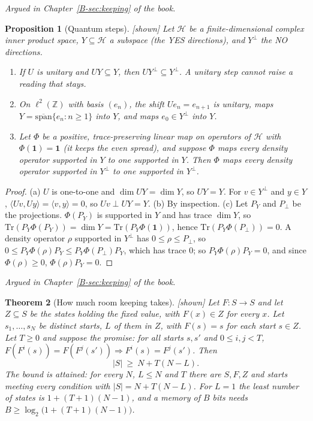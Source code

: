 \documentclass[11pt, a4paper]{article}
\theoremstyle{plain}
\newtheorem{theorem}{Theorem}[section]
\newtheorem{proposition}[theorem]{Proposition}
\theoremstyle{definition}
\theoremstyle{remark}
\newcommand{\Z}{\mathbb{Z}}
\newcommand{\argued}[1]{\par\noindent\textit{Argued in Chapter~\ref{B-#1} of the book.}\par}
\newcommand{\kind}[1]{\textup{[#1]}}
\begin{document}
\argued{sec:keeping}

\begin{proposition}[Quantum steps]\label{spec:quantum} \kind{shown}
Let $\mathcal H$ be a finite-dimensional complex inner product space, $Y\subseteq\mathcal H$ a subspace (the
YES directions), and $Y^\perp$ the NO directions.
\begin{enumerate}[label=(\alph*)]
\item If $U$ is unitary and $UY\subseteq Y$, then $UY^\perp\subseteq Y^\perp$. A unitary step cannot raise a
reading that stays.
\item On $\ell^2(\Z)$ with basis $(e_n)$, the shift $Ue_n=e_{n+1}$ is unitary, maps
$Y=\overline{\mathrm{span}}\{e_n:n\ge1\}$ into $Y$, and maps $e_0\in Y^\perp$ into $Y$.
\item Let $\Phi$ be a positive, trace-preserving linear map on operators of $\mathcal H$ with
$\Phi(\mathbf 1)=\mathbf 1$ (it keeps the even spread), and suppose $\Phi$ maps every density operator
supported in $Y$ to one supported in $Y$. Then $\Phi$ maps every density operator supported in $Y^\perp$ to
one supported in $Y^\perp$.
\end{enumerate}
\end{proposition}

\begin{proof}
(a) $U$ is one-to-one and $\dim UY=\dim Y$, so $UY=Y$. For $v\in Y^\perp$ and $y\in Y$,
$\langle Uv,Uy\rangle=\langle v,y\rangle=0$, so $Uv\perp UY=Y$.
(b) By inspection.
(c) Let $P_Y$ and $P_\perp$ be the projections. $\Phi(P_Y)$ is supported in $Y$ and has trace $\dim Y$, so
$\mathrm{Tr}(P_Y\Phi(P_Y))=\dim Y=\mathrm{Tr}(P_Y\Phi(\mathbf 1))$, hence $\mathrm{Tr}(P_Y\Phi(P_\perp))=0$.
A density operator $\rho$ supported in $Y^\perp$ has $0\le\rho\le P_\perp$, so
$0\le P_Y\Phi(\rho)P_Y\le P_Y\Phi(P_\perp)P_Y$, which has trace $0$; so $P_Y\Phi(\rho)P_Y=0$, and since
$\Phi(\rho)\ge0$, $\Phi(\rho)P_Y=0$.
\end{proof}

\argued{sec:keeping}

\begin{theorem}[How much room keeping takes]\label{spec:room} \kind{shown}
Let $F:S\to S$ and let $Z\subseteq S$ be the states holding the fixed value, with $F(x)\in Z$ for every $x$.
Let $s_1,\dots,s_N$ be distinct starts, $L$ of them in $Z$, with $F(s)=s$ for each start $s\in Z$. Let
$T\ge0$ and suppose the promise: for all starts $s,s'$ and $0\le i,j<T$,
$F(F^i(s))=F(F^j(s'))\Rightarrow F^i(s)=F^j(s')$. Then
\[
|S|\ \ge\ N+T(N-L).
\]
The bound is attained: for every $N$, $L\le N$ and $T$ there are $S,F,Z$ and starts meeting every condition
with $|S|=N+T(N-L)$. For $L=1$ the least number of states is $1+(T+1)(N-1)$, and a memory of $B$ bits needs
$B\ge\log_2\bigl(1+(T+1)(N-1)\bigr)$.
\end{theorem}
\end{document}
